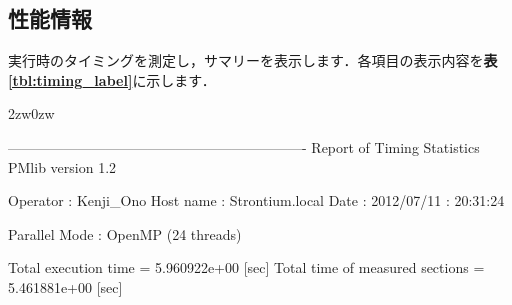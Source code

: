 %
\pagebreak
\hypertarget{tgt:profile}{\subsection{性能情報}}
実行時のタイミングを測定し，サマリーを表示します．各項目の表示内容を\textbf{表\ref{tbl:timing_label}}に示します．

\begin{indentation}{2zw}{0zw}
{\small 
\begin{program}
----------------------------------------------------------------
Report of Timing Statistics PMlib version 1.2

Operator  : Kenji_Ono
Host name : Strontium.local
Date      : 2012/07/11 : 20:31:24

Parallel Mode                    :   OpenMP (24 threads)

Total execution time            = 5.960922e+00 [sec]
Total time of measured sections = 5.461881e+00 [sec]


\end{program}}
\end{indentation}
